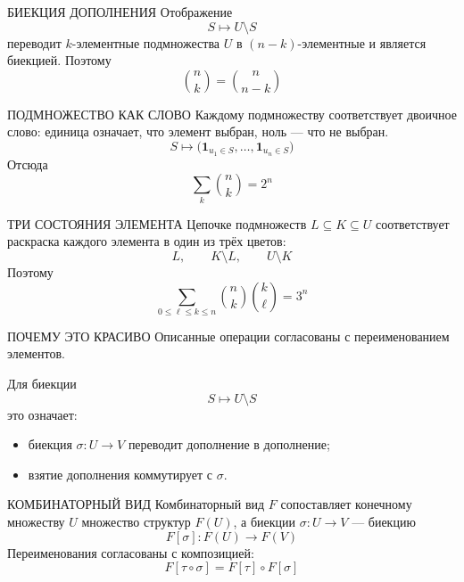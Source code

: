 \documentclass[aspectratio=169,11pt]{beamer}
\begin{document}
\begin{ctbottomframe}[illustration=36]{БИЕКЦИЯ ДОПОЛНЕНИЯ}{%
}
Отображение
\[
  S\longmapsto U\setminus S
\]
переводит $k$-элементные подмножества $U$ в
$(n-k)$-элементные и является биекцией. Поэтому
\small
\[
  \binom nk=\binom n{n-k}
\]
\end{ctbottomframe}

\begin{ctbottomframe}[illustration=36]{ПОДМНОЖЕСТВО КАК СЛОВО}{%
}
Каждому подмножеству соответствует двоичное слово: единица означает,
что элемент выбран, ноль — что не выбран.
\[
  S\longmapsto
  \bigl(\mathbf 1_{u_1\in S},\ldots,\mathbf 1_{u_n\in S}\bigr)
\]
Отсюда
\[
  \sum_k\binom nk=2^n
\]
\end{ctbottomframe}

\begin{ctbottomframe}[illustration=34]{ТРИ СОСТОЯНИЯ ЭЛЕМЕНТА}{%
}
Цепочке подмножеств $L\subseteq K\subseteq U$ соответствует раскраска
каждого элемента в один из трёх цветов:
\[
  L,\qquad K\setminus L,\qquad U\setminus K
\]
Поэтому
\[
  \sum_{0\le \ell\le k\le n}\binom nk\binom k\ell=3^n
\]
\end{ctbottomframe}

\begin{ctrightframe}[illustration=38]{ПОЧЕМУ ЭТО КРАСИВО}{%
}
Описанные операции согласованы с переименованием элементов.

Для биекции
\[
  S\longmapsto U\setminus S
\]
это означает:
\begin{itemize}
  \item биекция $\sigma\colon U\to V$ переводит дополнение в дополнение;
  \item взятие дополнения коммутирует с $\sigma$.
\end{itemize}
\end{ctrightframe}


\begin{ctrightframe}[illustration=35]{КОМБИНАТОРНЫЙ ВИД}{%
}
Комбинаторный вид $F$ сопоставляет конечному множеству $U$ множество
структур $F(U)$, а биекции $\sigma\colon U\to V$ — биекцию
\[
  F[\sigma]\colon F(U)\longrightarrow F(V)
\]
Переименования согласованы с композицией:
\[
  F[\tau\circ\sigma]=F[\tau]\circ F[\sigma]
\]
\end{ctrightframe}
\end{document}
